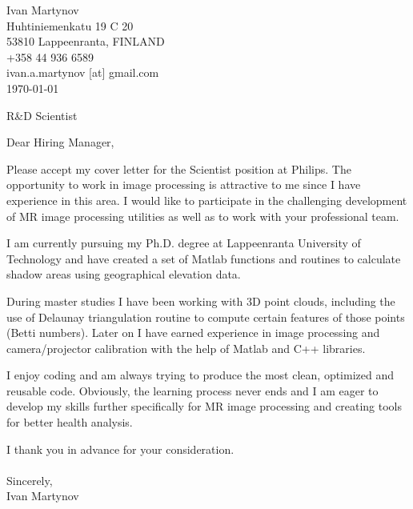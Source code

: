 \documentclass[]{article}
\begin{document}
\begin{flushright}
	Ivan Martynov\\
  Huhtiniemenkatu 19 C 20\\
	53810 Lappeenranta, FINLAND\\
	+358 44 936 6589\\
	ivan.a.martynov [at] gmail.com\\
	\today
\end{flushright}


\begin{center}
  R\&D Scientist
\end{center}

\noindent
Dear Hiring Manager,
\bigskip

\noindent
Please accept my cover letter for the Scientist position at Philips. The
opportunity to work in image processing is attractive to me since I have
experience in this area. I would like to participate in the challenging
development of MR image processing utilities as well as to work with your
professional team.
\medskip

\noindent
I am currently pursuing my Ph.D. degree at Lappeenranta University of
Technology and have created a set of Matlab functions and routines to
calculate shadow areas using geographical elevation data.
\medskip

\noindent
During master studies I have been working with 3D point clouds, including the
use of Delaunay triangulation routine to compute certain features of those
points (Betti numbers). Later on I have earned experience in image processing
and camera/projector calibration with the help of Matlab and C++ libraries.
\medskip

\noindent
I enjoy coding and am always trying to produce the most clean, optimized and
reusable code. Obviously, the learning process never ends and I am eager to
develop my skills further specifically for MR image processing and creating
tools for better health analysis.\\ \medskip

\noindent
I thank you in advance for your consideration.\\\ \\

\noindent Sincerely,\\
Ivan Martynov
\end{document}
